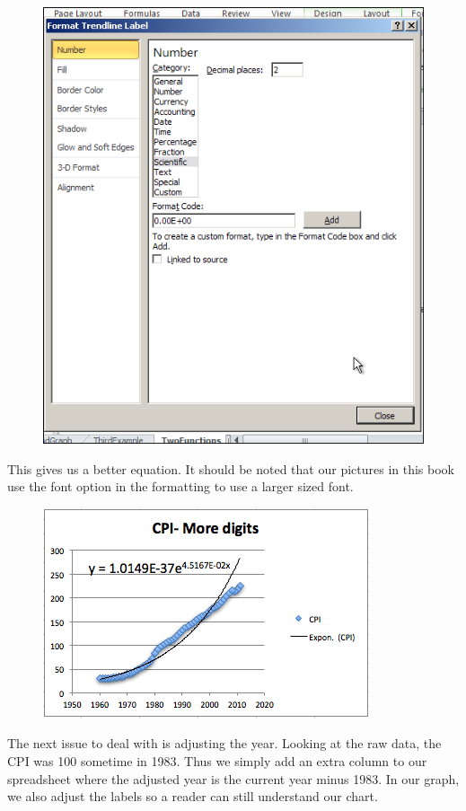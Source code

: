 \documentclass[10pt,]{book}
\theoremstyle{plain}
\theoremstyle{definition}
\theoremstyle{definition}
\begin{document}
  \leavevmode%
\begin{figure}
\centering
\includegraphics[width=0.8\linewidth]{images/sec1-5-11.png}
\end{figure}
 

%
\par
This gives us a better equation.  It should be noted that our pictures in this book use the font option in the formatting to use a larger sized font.

  \leavevmode%
\begin{figure}
\centering
\includegraphics[width=0.8\linewidth]{images/sec1-5-12.png}
\end{figure}
 

%
\par
The next issue to deal with is adjusting the year.  Looking at the raw data, the CPI was 100 sometime in 1983.  Thus we simply add an extra column to our spreadsheet where the adjusted year is the current year minus 1983.  In our graph, we also adjust the labels so a reader can still understand our chart.
\end{document}
